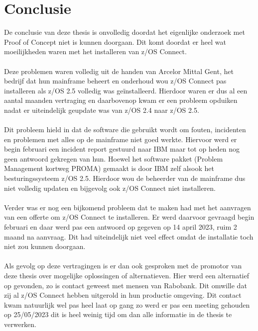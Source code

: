 
\chapter{Conclusie}%
\label{ch:conclusie}

De conclusie van deze thesis is onvolledig doordat het eigenlijke onderzoek met Proof of Concept niet is kunnen doorgaan. Dit komt doordat er heel wat moeilijkheden waren met het installeren van z/OS Connect.
\\ \\
Deze problemen waren volledig uit de handen van Arcelor Mittal Gent, het bedrijf dat hun mainframe beheert en onderhoud wou z/OS Connect pas installeren als z/OS 2.5 volledig was geïnstalleerd. Hierdoor waren er dus al een aantal maanden vertraging en daarbovenop kwam er een probleem opduiken nadat er uiteindelijk geupdate was van z/OS 2.4 naar z/OS 2.5.
\\ \\
Dit probleem hield in dat de software die gebruikt wordt om fouten, incidenten en problemen met alles op de mainframe niet goed werkte. Hiervoor werd er begin februari een incident report gestuurd naar IBM maar tot op heden nog geen antwoord gekregen van hun. Hoewel het software pakket (Problem Management kortweg PROMA) gemaakt is door IBM zelf alsook het besturingssysteem z/OS 2.5. Hierdoor wou de beheerder van de mainframe dus niet volledig updaten en bijgevolg ook z/OS Connect niet installeren.
\\ \\
Verder was er nog een bijkomend probleem dat te maken had met het aanvragen van een offerte om z/OS Connect te installeren. Er werd daarvoor gevraagd begin februari en daar werd pas een antwoord op gegeven op 14 april 2023, ruim 2 maand na aanvraag. Dit had uiteindelijk niet veel effect omdat de installatie toch niet zou kunnen doorgaan.
\\ \\
Als gevolg op deze vertragingen is er dan ook gesproken met de promotor van deze thesis over mogelijke oplossingen of alternatieven. Hier werd een alternatief op gevonden, zo is contact geweest met mensen van Rabobank. Dit omwille dat zij al z/OS Connect hebben uitgerold in hun productie omgeving. Dit contact kwam natuurlijk wel pas heel laat op gang zo werd er pas een meeting gehouden op 25/05/2023 dit is heel weinig tijd om dan alle informatie in de thesis te verwerken.

